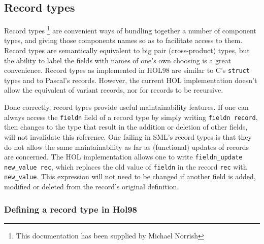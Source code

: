 \documentclass[12pt,fleqn,layout,a4paper]{report}
\begin{document}
\subsection{Record types}

Record types \footnote{This documentation has been supplied by Michael
Norrish} are convenient ways of bundling together a number of component
types, and giving those components names so as to facilitate access to
them.  Record types are semantically equivalent to big pair
(cross-product) types, but the ability to label the fields with names of
one's own choosing is a great convenience.  Record types as implemented
in HOL98 are similar to C's {\tt struct} types and to Pascal's records.
However, the current HOL implementation doesn't allow the equivalent of
variant records, nor for records to be recursive.

Done correctly, record types provide useful maintainability features.
If one can always access the {\tt fieldn} field of a record type by
simply writing {\tt fieldn record}, then changes to the type that
result in the addition or deletion of other fields, will not
invalidate this reference.  One failing in SML's record types is that
they do not allow the same maintainability as far as (functional)
updates of records are concerned.  The HOL implementation allows one
to write {\tt fieldn\_update new\_value rec}, which replaces the old
value of {\tt fieldn} in the record {\tt rec} with {\tt new\_value}.
This expression will not need to be changed if another field is added,
modified or deleted from the record's original definition.

\subsubsection{Defining a record type in Hol98}
\end{document}
